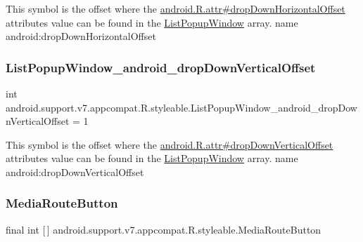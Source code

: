 This symbol is the offset where the \hyperlink{}{android.\+R.\+attr\#drop\+Down\+Horizontal\+Offset} attribute\textquotesingle{}s value can be found in the \hyperlink{classandroid_1_1support_1_1v7_1_1appcompat_1_1R_1_1styleable_a87f1d1e417d9894ead464548553aff2c}{List\+Popup\+Window} array.  name android\+:drop\+Down\+Horizontal\+Offset \mbox{\label{classandroid_1_1support_1_1v7_1_1appcompat_1_1R_1_1styleable_aaa07ae53bae27545095ffbee08f9777e}} 
\subsubsection{\texorpdfstring{List\+Popup\+Window\+\_\+android\+\_\+drop\+Down\+Vertical\+Offset}{ListPopupWindow\_android\_dropDownVerticalOffset}}
{\footnotesize\ttfamily int android.\+support.\+v7.\+appcompat.\+R.\+styleable.\+List\+Popup\+Window\+\_\+android\+\_\+drop\+Down\+Vertical\+Offset = 1\hspace{0.3cm}{\ttfamily [static]}}

This symbol is the offset where the \hyperlink{}{android.\+R.\+attr\#drop\+Down\+Vertical\+Offset} attribute\textquotesingle{}s value can be found in the \hyperlink{classandroid_1_1support_1_1v7_1_1appcompat_1_1R_1_1styleable_a87f1d1e417d9894ead464548553aff2c}{List\+Popup\+Window} array.  name android\+:drop\+Down\+Vertical\+Offset \mbox{\label{classandroid_1_1support_1_1v7_1_1appcompat_1_1R_1_1styleable_a72a73867c6dd3b8e7dcaca5a3ce1e2d6}} 
\subsubsection{\texorpdfstring{Media\+Route\+Button}{MediaRouteButton}}
{\footnotesize\ttfamily final int \mbox{[}$\,$\mbox{]} android.\+support.\+v7.\+appcompat.\+R.\+styleable.\+Media\+Route\+Button\hspace{0.3cm}{\ttfamily [static]}}

